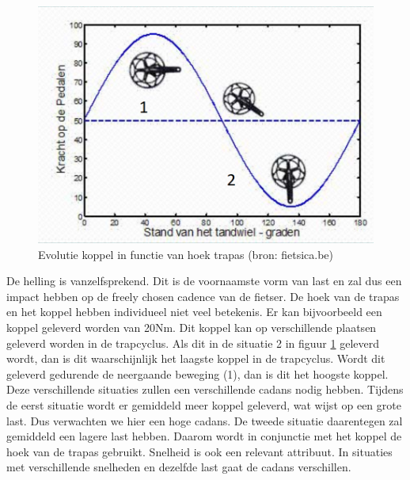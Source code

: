 \begin{figure}
  \centering
  \includegraphics[width=\linewidth]{images/trapcyclus.png}
  \caption{Evolutie koppel in functie van hoek trapas (bron: fietsica.be)}
  \label{fig:Evolutie koppel in functie van hoek trapas}
\end{figure}
\noindent De helling is vanzelfsprekend. Dit is de voornaamste vorm van last en zal dus een impact hebben op de freely chosen cadence van de fietser. De hoek van de trapas en het koppel hebben individueel niet veel betekenis. Er kan bijvoorbeeld een koppel geleverd worden van 20Nm. Dit koppel kan op verschillende plaatsen geleverd worden in de trapcyclus. Als dit in de situatie 2 in figuur \ref{fig:Evolutie koppel in functie van hoek trapas} geleverd wordt, dan is dit waarschijnlijk het laagste koppel in de trapcyclus. Wordt dit geleverd gedurende de neergaande beweging (1), dan is dit het hoogste koppel. Deze verschillende situaties zullen een verschillende cadans nodig hebben. Tijdens de eerst situatie wordt er gemiddeld meer koppel geleverd, wat wijst op een grote last. Dus verwachten we hier een hoge cadans. De tweede situatie daarentegen zal gemiddeld een lagere last hebben. Daarom wordt in conjunctie met het koppel de hoek van de trapas gebruikt. Snelheid is ook een relevant attribuut. In situaties met verschillende snelheden en dezelfde last gaat de cadans verschillen.
